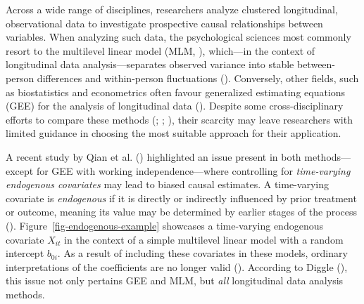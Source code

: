 \documentclass[
  12pt,
  a4paper,
]{article}
\begin{document}
Across a wide range of disciplines, researchers analyze clustered
longitudinal, observational data to investigate prospective causal
relationships between variables. When analyzing such data, the
psychological sciences most commonly resort to the multilevel linear
model (MLM, ),
which---in the context of longitudinal data analysis---separates
observed variance into stable between-person differences and
within-person fluctuations (). Conversely, other fields, such as biostatistics and
econometrics often favour generalized estimating equations (GEE) for the
analysis of longitudinal data (). Despite some cross-disciplinary efforts to compare these
methods (;
; ), their scarcity may leave researchers with limited
guidance in choosing the most suitable approach for their application.

A recent study by Qian et al. ()
highlighted an issue present in both methods---except for GEE with
working independence---where controlling for \emph{time-varying
endogenous covariates} may lead to biased causal estimates. A
time-varying covariate is \emph{endogenous} if it is directly or
indirectly influenced by prior treatment or outcome, meaning its value
may be determined by earlier stages of the process
().
Figure~\ref{fig-endogenous-example} showcases a time-varying endogenous
covariate \(X_{it}\) in the context of a simple multilevel linear model
with a random intercept \(b_{0i}\). As a result of including these
covariates in these models, ordinary interpretations of the coefficients
are no longer valid ().
According to Diggle (), this issue not
only pertains GEE and MLM, but \emph{all} longitudinal data analysis
methods.
\end{document}
